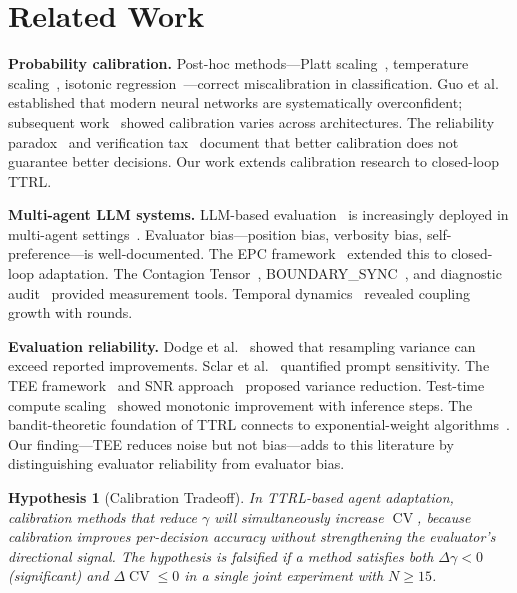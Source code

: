 \documentclass[11pt]{article}
\DeclareMathOperator{\CV}{CV}
\newtheorem{hypothesis}{Hypothesis}
\begin{document}
\section{Related Work}

\textbf{Probability calibration.} Post-hoc methods---Platt scaling~\cite{platt1999probabilistic}, temperature scaling~\cite{kull2017temperature}, isotonic regression~\cite{niculescu2005predicting}---correct miscalibration in classification. Guo et al.~\cite{guo2017calibration} established that modern neural networks are systematically overconfident; subsequent work~\cite{minderer2021revisiting,wang2021revisiting} showed calibration varies across architectures. The reliability paradox~\cite{he2026paradox} and verification tax~\cite{mills2026verification} document that better calibration does not guarantee better decisions. Our work extends calibration research to closed-loop TTRL.

\textbf{Multi-agent LLM systems.} LLM-based evaluation~\cite{zheng2023judging,chiang2024chatbot} is increasingly deployed in multi-agent settings~\cite{li2023camel,wu2024autogen}. Evaluator bias---position bias, verbosity bias, self-preference---is well-documented. The EPC framework~\cite{liu2026epc} extended this to closed-loop adaptation. The Contagion Tensor~\cite{liu2026tensor}, BOUNDARY\_SYNC~\cite{liu2026boundarysync}, and diagnostic audit~\cite{liu2026audit} provided measurement tools. Temporal dynamics~\cite{liu2026temporal} revealed coupling growth with rounds.

\textbf{Evaluation reliability.} Dodge et al.~\cite{dodge2019reproducibility} showed that resampling variance can exceed reported improvements. Sclar et al.~\cite{sclar2024quantifying} quantified prompt sensitivity. The TEE framework~\cite{messing2026tee} and SNR approach~\cite{heineman2025snr} proposed variance reduction. Test-time compute scaling~\cite{snell2024scaling} showed monotonic improvement with inference steps. The bandit-theoretic foundation of TTRL connects to exponential-weight algorithms~\cite{bubeck2012regret}. Our finding---TEE reduces noise but not bias---adds to this literature by distinguishing evaluator reliability from evaluator bias.

\begin{hypothesis}[Calibration Tradeoff]
In TTRL-based agent adaptation, calibration methods that reduce $\gamma$ will simultaneously increase $\CV$, because calibration improves per-decision accuracy without strengthening the evaluator's directional signal. The hypothesis is falsified if a method satisfies \textit{both} $\Delta\gamma < 0$ (significant) \textit{and} $\Delta\CV \leq 0$ in a single joint experiment with $N \geq 15$.
\end{hypothesis}
\end{document}
